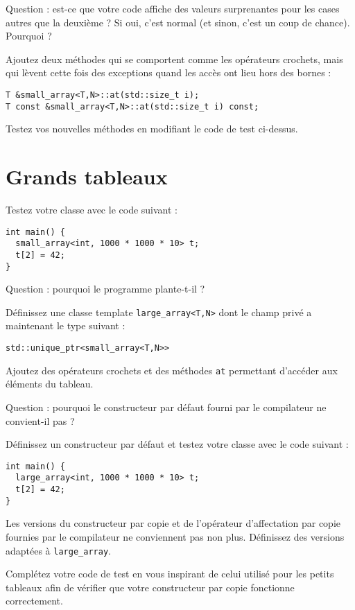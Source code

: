 \documentclass[a4paper]{article}
\begin{document}
Question : est-ce que votre code affiche des valeurs surprenantes pour
les cases autres que la deuxième ? Si oui, c'est normal (et sinon, c'est
un coup de chance). Pourquoi ?

Ajoutez deux méthodes qui se comportent comme les opérateurs crochets,
mais qui lèvent cette fois des exceptions quand les accès ont lieu hors
des bornes :
\begin{lstlisting}
T &small_array<T,N>::at(std::size_t i);
T const &small_array<T,N>::at(std::size_t i) const;
\end{lstlisting}

Testez vos nouvelles méthodes en modifiant le code de test ci-dessus.

\section{Grands tableaux}

Testez votre classe avec le code suivant :
\begin{lstlisting}
int main() {
  small_array<int, 1000 * 1000 * 10> t;
  t[2] = 42;
}
\end{lstlisting}

Question : pourquoi le programme plante-t-il ?

Définissez une classe template \lstinline|large_array<T,N>| dont le champ
privé a maintenant le type suivant :
\begin{lstlisting}
std::unique_ptr<small_array<T,N>>
\end{lstlisting}

Ajoutez des opérateurs crochets et des méthodes \lstinline|at| permettant
d'accéder aux éléments du tableau.

Question : pourquoi le constructeur par défaut fourni par le compilateur
ne convient-il pas ?

Définissez un constructeur par défaut et testez votre classe avec le code
suivant :
\begin{lstlisting}
int main() {
  large_array<int, 1000 * 1000 * 10> t;
  t[2] = 42;
}
\end{lstlisting}

Les versions du constructeur par copie et de l'opérateur d'affectation
par copie fournies par le compilateur ne conviennent pas non
plus. Définissez des versions adaptées à \lstinline|large_array|.

Complétez votre code de test en vous inspirant de celui utilisé pour les
petits tableaux afin de vérifier que votre constructeur par copie
fonctionne correctement.
\end{document}
